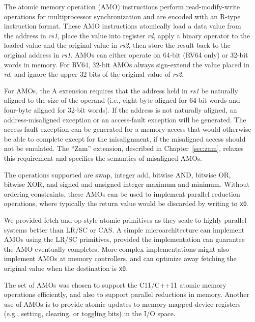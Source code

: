 \vspace{-0.1in} The atomic memory operation (AMO) instructions perform
read-modify-write operations for multiprocessor synchronization and
are encoded with an R-type instruction format.  These AMO instructions
atomically load a data value from the address in {\em rs1}, place the
value into register {\em rd}, apply a binary operator to the loaded
value and the original value in {\em rs2}, then store the result back
to the original address in {\em rs1}. AMOs can either operate on 64-bit (RV64
only) or 32-bit words in memory.  For RV64, 32-bit AMOs always
sign-extend the value placed in {\em rd}, and ignore the upper 32 bits
of the original value of {\em rs2}.

For AMOs, the A extension requires that the address held in {\em rs1}
be naturally aligned to the size of the operand (i.e., eight-byte
aligned for 64-bit words and four-byte aligned for 32-bit words).  If
the address is not naturally aligned, an address-misaligned exception
or an access-fault exception will be generated.  The access-fault exception can be
generated for a memory access that would otherwise be able to complete
except for the misalignment, if the misaligned access should not be
emulated.  The ``Zam'' extension, described in Chapter~\ref{sec:zam},
relaxes this requirement and specifies the semantics of misaligned
AMOs.

The operations supported are swap, integer add, bitwise AND, bitwise
OR, bitwise XOR, and signed and unsigned integer maximum and minimum.
Without ordering constraints, these AMOs can be used to implement
parallel reduction operations, where typically the return value would
be discarded by writing to {\tt x0}.

\begin{commentary}
We provided fetch-and-op style atomic primitives as they scale to
highly parallel systems better than LR/SC or CAS.
A simple microarchitecture can implement AMOs using the LR/SC primitives,
provided the implementation can guarantee the AMO eventually completes.
More complex implementations might also implement AMOs at memory
controllers, and can optimize away fetching the original value when
the destination is {\tt x0}.

The set of AMOs was chosen to support the C11/C++11 atomic memory
operations efficiently, and also to support parallel reductions in
memory.  Another use of AMOs is to provide atomic updates to
memory-mapped device registers (e.g., setting, clearing, or toggling
bits) in the I/O space.
\end{commentary}

